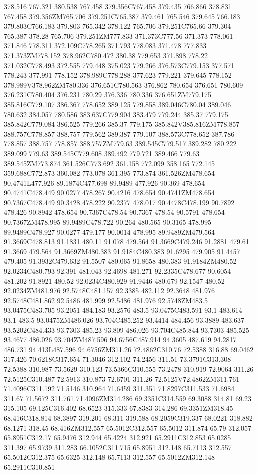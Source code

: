 378.516 767.321 380.538 767.458 379.356C767.458 379.435 766.866 378.831 767.458 379.356ZM765.706 379.251C765.387 379.461 765.546 379.645 766.183 379.803C766.183 379.803 765.342 378.122 765.706 379.251C765.66 379.304 765.387 378.28 765.706 379.251ZM777.833 371.373C777.56 371.373 778.061 371.846 778.311 372.109C778.265 371.793 778.083 371.478 777.833 371.373ZM778.152 378.962C780.472 380.38 779.653 371.898 778.22 371.032C778.493 372.555 779.448 375.023 779.266 376.573C779.153 377.571 778.243 377.991 778.152 378.989C778.288 377.623 779.221 379.645 778.152 378.989V378.962ZM780.336 376.651C780.563 376.862 780.654 376.651 780.609 376.231C780.404 376.231 780.29 376.336 780.336 376.651ZM779.175 385.816C779.107 386.367 778.652 389.125 779.858 389.046C780.04 389.046 780.632 384.057 780.586 383.637C779.904 383.479 779.244 385.37 779.175 385.842C779.084 386.525 779.266 385.37 779.175 385.842V385.816ZM778.857 388.757C778.857 388.757 779.562 389.387 779.107 388.573C778.652 387.786 778.857 388.757 778.857 388.757ZM779.63 389.545C779.517 389.282 780.222 389.099 779.63 389.545C779.608 389.492 779.721 389.466 779.63 389.545ZM773.874 361.526C773.692 361.158 772.099 358.165 772.145 359.688C772.873 360.082 773.078 361.395 773.874 361.526ZM478.654 90.4741L477.926 89.1874C477.698 89.9489 477.926 90.369 478.654 90.4741C478.449 90.0277 478.267 90.4216 478.654 90.4741ZM478.654 90.7367C478.449 90.3428 478.222 90.2377 478.017 90.4478C478.199 90.7892 478.426 90.8942 478.654 90.7367C478.54 90.7367 478.54 90.5791 478.654 90.7367ZM478.995 89.9489C478.722 90.264 480.565 90.3165 478.995 89.9489C478.927 90.0277 479.177 90.0014 478.995 89.9489ZM479.564 91.3669C478.813 91.1831 480.11 91.078 479.564 91.3669C479.246 91.2881 479.61 91.3669 479.564 91.3669ZM480.383 91.9184C480.383 91.6295 479.905 91.4457 479.405 91.3932C479.632 91.5507 480.065 91.8658 480.383 91.9184ZM480.52 92.0234C480.793 92.391 481.043 92.4698 481.271 92.2335C478.677 90.6054 481.202 91.8921 480.52 92.0234C480.929 91.9446 480.679 92.1547 480.52 92.0234ZM481.976 92.5748C481.157 92.3385 482.112 92.3648 481.976 92.5748C481.862 92.5486 481.999 92.5486 481.976 92.5748ZM483.5 93.0475C483.705 93.2051 484.183 93.2576 483.5 93.0475C483.591 93.1 483.614 93.1 483.5 93.0475ZM486.026 93.704C485.252 93.4414 484.456 93.3889 483.637 93.5202C484.433 93.7303 485.23 93.809 486.026 93.704C485.844 93.7303 485.525 93.4677 486.026 93.704ZM487.596 94.6756C487.914 94.3605 487.619 94.2817 486.731 94.413L487.596 94.6756ZM311.26 72.4862C310.76 72.5388 316.88 69.0462 317.426 70.6218C317.654 71.3046 312.102 74.2456 311.51 73.3791C313.308 72.5388 310.987 73.5629 310.123 73.5366C310.555 73.2478 310.919 72.9064 311.26 72.5125C310.487 72.5913 310.873 72.6701 311.26 72.5125V72.4862ZM311.761 71.4096C311.192 71.5146 310.964 71.6459 311.351 71.8297C311.533 71.6984 311.67 71.5672 311.761 71.4096ZM314.286 69.3351C314.559 69.3088 314.81 69.23 315.105 69.125C316.402 68.6523 315.333 67.8383 314.286 69.3351ZM318.45 68.416C318.814 68.3897 319.201 68.311 319.588 68.2059C319.337 68.0221 318.882 68.1271 318.45 68.416ZM312.557 65.5012C312.557 65.5012 311.874 65.79 312.057 65.8951C312.17 65.9476 312.944 65.4224 312.921 65.2911C312.853 65.0285 311.397 65.9739 311.283 66.1052C311.715 65.8951 312.148 65.7113 312.557 65.5012C312.375 65.6325 312.148 65.7113 312.557 65.5012ZM312.148 65.2911C310.851 